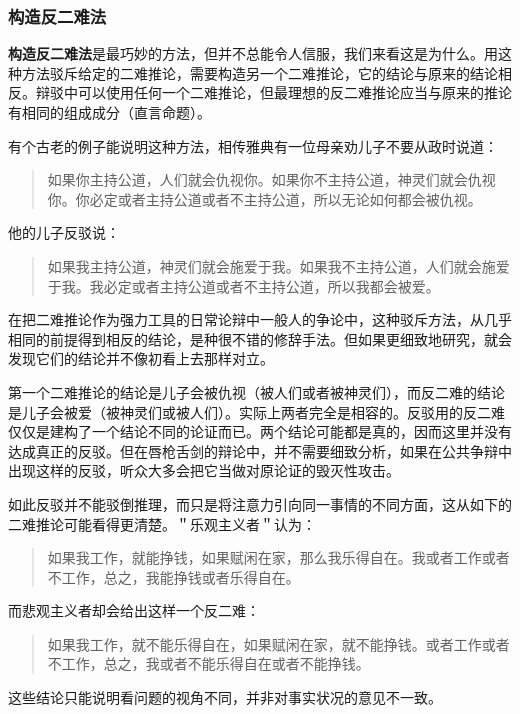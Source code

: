 \subsubsection{构造反二难法}

\textbf{构造反二难法}是最巧妙的方法，但并不总能令人信服，我们来看这是为什么。用这种方法驳斥给定的二难推论，需要构造另一个二难推论，它的结论与原来的结论相反。辩驳中可以使用任何一个二难推论，但最理想的反二难推论应当与原来的推论有相同的组成成分（直言命题）。

有个古老的例子能说明这种方法，相传雅典有一位母亲劝儿子不要从政时说道：

\begin{quote}
如果你主持公道，人们就会仇视你。如果你不主持公道，神灵们就会仇视你。你必定或者主持公道或者不主持公道，所以无论如何都会被仇视。
\end{quote}

他的儿子反驳说：

\begin{quote}
如果我主持公道，神灵们就会施爱于我。如果我不主持公道，人们就会施爱于我。我必定或者主持公道或者不主持公道，所以我都会被爱。
\end{quote}

在把二难推论作为强力工具的日常论辩中一般人的争论中，这种驳斥方法，从几乎相同的前提得到相反的结论，是种很不错的修辞手法。但如果更细致地研究，就会发现它们的结论并不像初看上去那样对立。

第一个二难推论的结论是儿子会被仇视（被人们或者被神灵们），而反二难的结论是儿子会被爱（被神灵们或被人们）。实际上两者完全是相容的。反驳用的反二难仅仅是建构了一个结论不同的论证而已。两个结论可能都是真的，因而这里并没有达成真正的反驳。但在唇枪舌剑的辩论中，并不需要细致分析，如果在公共争辩中出现这样的反驳，听众大多会把它当做对原论证的毁灭性攻击。

如此反驳并不能驳倒推理，而只是将注意力引向同一事情的不同方面，这从如下的二难推论可能看得更清楚。＂乐观主义者＂认为：

\begin{quote}
如果我工作，就能挣钱，如果赋闲在家，那么我乐得自在。我或者工作或者不工作，总之，我能挣钱或者乐得自在。
\end{quote}

而悲观主义者却会给出这样一个反二难：

\begin{quote}
如果我工作，就不能乐得自在，如果赋闲在家，就不能挣钱。或者工作或者不工作，总之，我或者不能乐得自在或者不能挣钱。
\end{quote}

这些结论只能说明看问题的视角不同，并非对事实状况的意见不一致。

